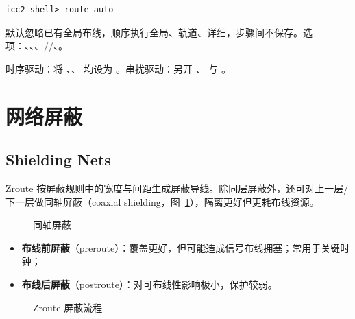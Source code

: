 \begin{lstlisting}
icc2_shell> route_auto
\end{lstlisting}

默认忽略已有全局布线，顺序执行全局、轨道、详细，步骤间不保存。选项：、、、//、。

时序驱动：将 、、 均设为 。串扰驱动：另开 、 与 。

\section{网络屏蔽}
\subsection*{Shielding Nets}

Zroute 按屏蔽规则中的宽度与间距生成屏蔽导线。除同层屏蔽外，还可对上一层/下一层做同轴屏蔽（coaxial shielding，图~\ref{fig:coaxial-shield}），隔离更好但更耗布线资源。

\begin{figure}[htbp]
\centering
{}
\caption{同轴屏蔽}
\label{fig:coaxial-shield}
\end{figure}

\begin{itemize}
  \item \textbf{布线前屏蔽}（preroute）：覆盖更好，但可能造成信号布线拥塞；常用于关键时钟；
  \item \textbf{布线后屏蔽}（postroute）：对可布线性影响极小，保护较弱。
\end{itemize}

\begin{figure}[htbp]
\centering
{}
\caption{Zroute 屏蔽流程}
\label{fig:shield-flow}
\end{figure}


